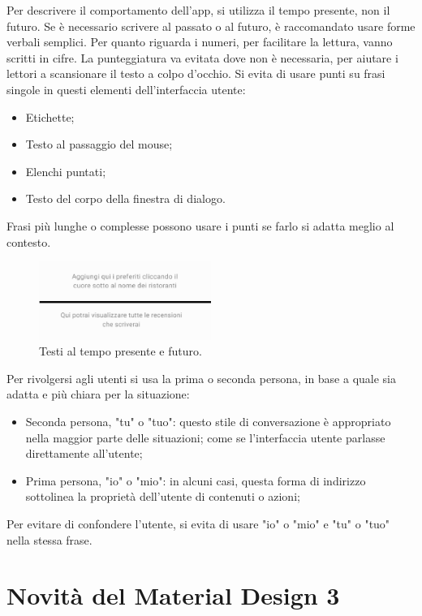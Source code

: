 \documentclass[12pt, a4paper]{report}
\begin{document}
	Per descrivere il comportamento dell’app, si utilizza il tempo presente, non il futuro. Se è necessario scrivere al passato o al futuro, è raccomandato usare forme verbali semplici. Per quanto riguarda i numeri,  per facilitare la lettura, vanno scritti in cifre.
	La punteggiatura va evitata dove non è necessaria, per aiutare i lettori a scansionare il testo a colpo d'occhio. Si evita di usare punti su frasi singole in questi elementi dell'interfaccia utente:
	\begin{itemize}
		\item Etichette;
		\item Testo al passaggio del mouse;
		\item Elenchi puntati;
		\item Testo del corpo della finestra di dialogo.
	\end{itemize}
	Frasi più lunghe o complesse possono usare i punti se farlo si adatta meglio al contesto.
	\begin{figure}[h]
		\centering
		\includegraphics[width=0.5\textwidth]{scrittura}
		\caption{Testi al tempo presente e futuro.}
	\end{figure}
	Per rivolgersi agli utenti si usa la prima o seconda persona, in base a quale sia adatta e più chiara per la situazione:
	\begin{itemize}
		\item Seconda persona, "tu" o "tuo": questo stile di conversazione è appropriato nella maggior parte delle situazioni; come se l'interfaccia utente parlasse direttamente all'utente;
		\item Prima persona, "io"  o "mio": in alcuni casi, questa forma di indirizzo sottolinea la proprietà dell'utente di contenuti o azioni;
	\end{itemize}
	Per evitare di confondere l'utente, si evita di usare "io" o "mio" e "tu" o "tuo" nella stessa frase.




\chapter{Novità del Material Design 3}
\end{document}
